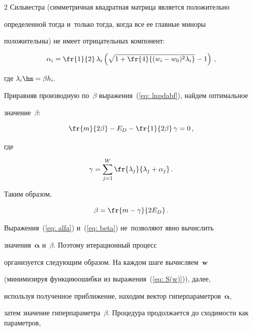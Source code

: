 \begin{multicols}{2}
Сильвестра (симметричная квадратная матрица является положительно

определенной тогда и~только тогда, когда все ее главные миноры

положительны) не имеет отрицательных компонент:

\begin{equation}

\label {eq: alfa}

\alpha_i=\fr{1}{2}\,\lambda_i\left(\sqrt{1+\fr{4}{(w_{i}-w_{0})^{2}\lambda_i}}-1\right)\,,

\end{equation}

где $\lambda_i\hm=\beta h_i.$



Приравняв производную по~$\beta$ выражения~(\ref{eq: lnpdabf}), найдем оптимальное 

значение~$\beta$:

$$

\fr{m}{2\beta}-E_D-\fr{1}{2\beta}\,\gamma=0\,,

$$

где

$$

\gamma=\sum\limits_{j=1}^W \fr{\lambda_j}{\lambda_j + \alpha_j}\,.

$$

Таким образом,

\begin{equation}

\label {eq: beta}

\beta=\fr{m-\gamma}{2E_D}\,.

\end{equation}



Выражения~(\ref{eq: alfa}) и~(\ref{eq: beta}) не~позволяют явно вы\-чис\-лить 

значения~$\boldsymbol{\alpha}$ и~$\beta$. Поэтому итерационный процесс 

организуется следующим образом. На каж\-дом шаге вычисляем~$\mathbf{w}$ 

(минимизируя функцию\linebreak ошибки из выражения~(\ref{eq: S(w)})), далее, 

используя полученное приближение, находим вектор гиперпараметров~$\boldsymbol{\alpha}$, 

затем значение гиперпараметра~$\beta$. \mbox{Процедура} продолжается до сходимости как па\-ра\-мет\-ров, 


\end{multicols}
